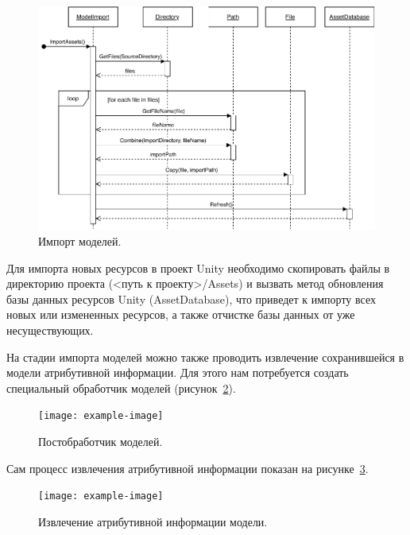 \begin{figure}[ht]
    \centering
    \includegraphics[width=1.0\textwidth]{images/UML-SImportModels.pdf}
    \caption{Импорт моделей.}
    \label{figure:SImportModels}
\end{figure}

Для импорта новых ресурсов в проект Unity необходимо скопировать
файлы в директорию проекта (<путь к проекту>/Assets)
и вызвать метод обновления базы данных ресурсов Unity (AssetDatabase),
что приведет к импорту всех новых или измененных ресурсов,
а также отчистке базы данных от уже несуществующих.%
\cite{DocUnity}

На стадии импорта моделей можно также проводить извлечение
сохранившейся в модели атрибутивной информации.
Для этого нам потребуется создать специальный обработчик моделей
(рисунок~\ref{figure:CPostprocessor}). 

\begin{figure}[ht]
    \centering
    \texttt{[image: example-image]}
    \caption{Постобработчик моделей.}
    \label{figure:CPostprocessor}
\end{figure}

Сам процесс извлечения атрибутивной информации показан
на рисунке~\ref{figure:SPostprocessor}.

\begin{figure}[ht]
    \centering
    \texttt{[image: example-image]}
    \caption{Извлечение атрибутивной информации модели.}
    \label{figure:SPostprocessor}
\end{figure}


